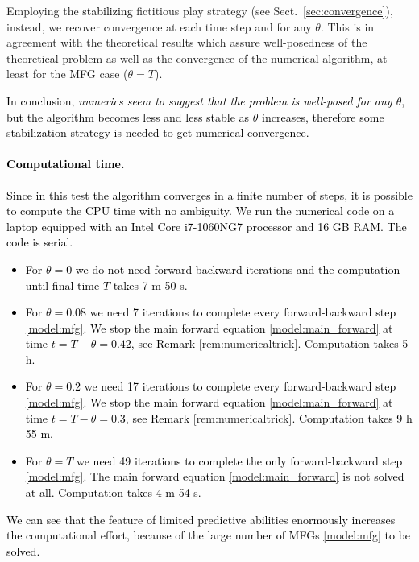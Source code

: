 \documentclass{cmslatex}
\newcommand{\REV}[1]{\textcolor{black}{#1}}
\begin{document}
Employing the \REV{stabilizing} fictitious play strategy (see Sect.\ \ref{sec:convergence}), instead, we recover convergence at each time step and for any $\theta$. 
This is in agreement with the theoretical results which assure well-posedness of the theoretical problem as well as the convergence of the numerical algorithm, at least for the MFG case ($\theta=T$).

\REV{In conclusion, \emph{numerics seem to suggest that the problem is well-posed for any $\theta$}, but the algorithm becomes less and less stable as $\theta$ increases, therefore some stabilization strategy is needed to get numerical convergence.}


\REV{\paragraph{Computational time.} Since in this test the algorithm converges in a finite number of steps, it is possible to compute the CPU time with no ambiguity. We run the numerical code on a laptop equipped with an Intel Core i7-1060NG7 processor and 16 GB RAM. The code is serial. 
\begin{itemize}[leftmargin=*]
\item For $\theta=0$ we do not need forward-backward iterations and the computation until final time $T$ takes 7 m 50 s.
%
\item For $\theta=0.08$ we need 7 iterations to complete every forward-backward step \eqref{model:mfg}. We stop the main forward equation \eqref{model:main_forward} at time $t=T-\theta=0.42$, see Remark \ref{rem:numericaltrick}. Computation takes 5 h.
%
\item For $\theta=0.2$ we need 17 iterations to complete every forward-backward step \eqref{model:mfg}. We stop the main forward equation \eqref{model:main_forward} at time $t=T-\theta=0.3$, see Remark \ref{rem:numericaltrick}. Computation takes 9 h 55 m.
%
\item For $\theta=T$ we need 49 iterations to complete the only forward-backward step \eqref{model:mfg}. The main forward equation \eqref{model:main_forward} is not solved at all. Computation takes 4 m 54 s.
\end{itemize}
We can see that the feature of limited predictive abilities enormously increases the computational effort, because of the large number of MFGs \eqref{model:mfg} to be solved.
}
%
%
%
%
\end{document}
